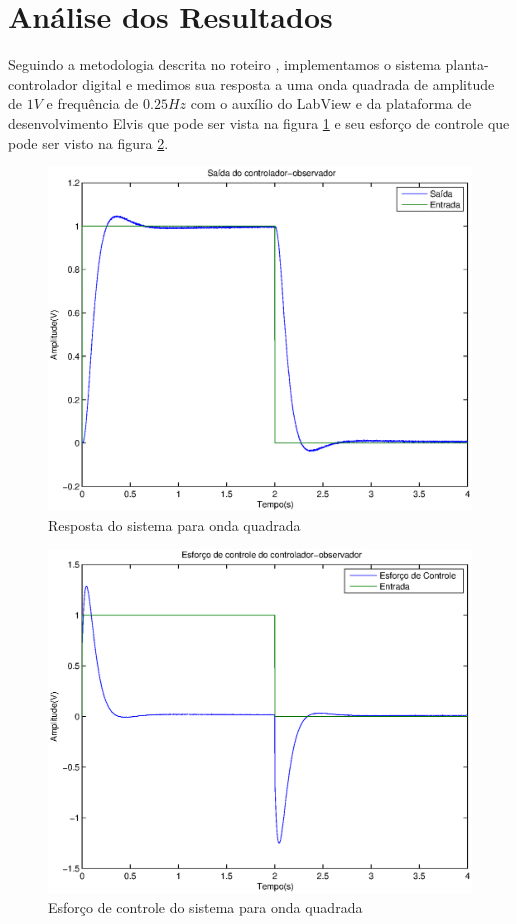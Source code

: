 \documentclass{article}
\begin{document}
\section{Análise dos Resultados}
Seguindo a metodologia descrita no roteiro \cite{bb:roteiro}, implementamos o sistema planta-controlador digital e medimos sua resposta a uma onda quadrada de amplitude de $1V$ e frequência de $0.25Hz$ com o auxílio do LabView e da plataforma de desenvolvimento Elvis que pode ser vista na figura \ref{fig:yrSIS} e seu esforço de controle que pode ser visto na figura \ref{fig:urSIS}.

\begin{figure}[H]
	\centering
	\includegraphics[width=0.8\linewidth]{../yrSIS}
	\caption{Resposta do sistema para onda quadrada}
	\label{fig:yrSIS}
\end{figure}
\begin{figure}[H]
	\centering
	\includegraphics[width=0.8\linewidth]{../urSIS}
	\caption{Esforço de controle do sistema para onda quadrada}
	\label{fig:urSIS}
\end{figure}
\end{document}
